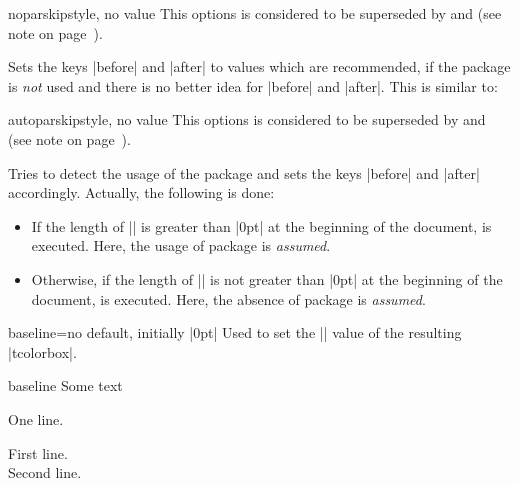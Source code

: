 \begin{docTcbKey}[][doc updated=2017-02-01]{noparskip}{}{style, no value}
  This options is considered to be superseded by
   and 
  (see note on page~\pageref{subsec:surroundings}).\par
  Sets the keys |before| and |after| to values which are
  recommended, if the package  is \emph{not} used and there is no better
  idea for |before| and |after|. This is similar to:
\begin{dispListing}
\end{dispListing}
\end{docTcbKey}

\begin{docTcbKey}{autoparskip}{}{style, no value}
  This options is considered to be superseded by
   and 
  (see note on page~\pageref{subsec:surroundings}).\par
  Tries to detect the usage of the package  and sets
  the keys |before| and |after| accordingly. Actually, the following is done:
  \begin{itemize}
  \item If the length of |\parskip| is greater than |0pt| at the beginning of the document,
     is executed. Here, the usage of package  is \emph{assumed}.
  \item Otherwise, if the length of |\parskip| is not greater than |0pt| at the beginning of the document,
     is executed. Here, the absence of package  is \emph{assumed}.
  \end{itemize}
\end{docTcbKey}


\clearpage

\begin{docTcbKey}{baseline}{=}{no default, initially |0pt|}
  Used to set the |\pgfsetbaseline| value of the resulting |tcolorbox|.
\begin{exdispExample}{baseline}
Some text\dotfill
\begin{tcolorbox}[baseline=3mm]
One line.
\end{tcolorbox}
\begin{tcolorbox}[baseline=3mm]
First line.\\Second line.
\end{tcolorbox}
\end{exdispExample}
\end{docTcbKey}


